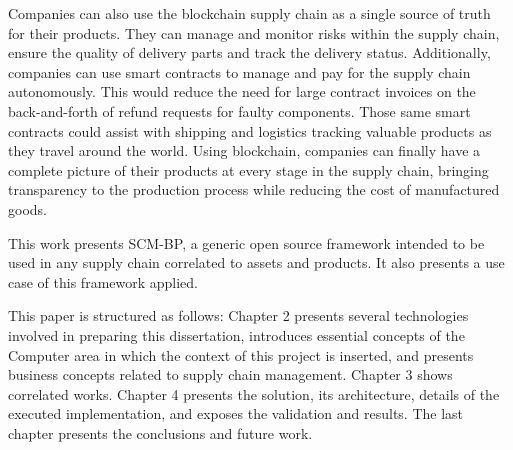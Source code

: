 Companies can also use the blockchain supply chain as a single source of truth for their products. They can manage and monitor risks within the supply chain, ensure the quality of delivery parts and track the delivery status. Additionally, companies can use smart contracts to manage and pay for the supply chain autonomously. This would reduce the need for large contract invoices on the back-and-forth of refund requests for faulty components. Those same smart contracts could assist with shipping and logistics tracking valuable products as they travel around the world. Using blockchain, companies can finally have a complete picture of their products at every stage in the supply chain, bringing transparency to the production process while reducing the cost of manufactured goods.

This work presents \acf{SCM-BP}, a generic open source framework intended to be used in any supply chain correlated to assets and products. It also presents a use case of this framework applied.

This paper is structured as follows: Chapter 2 presents several technologies involved in preparing this dissertation, introduces essential concepts of the Computer area in which the context of this project is inserted, and presents business concepts related to supply chain management. Chapter 3 shows correlated works. Chapter 4 presents the solution, its architecture, details of the executed implementation, and exposes the validation and results. The last chapter presents the conclusions and future work.